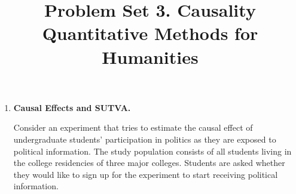 \documentclass[12pt]{article}
\author{\empty}
\title{Problem Set 3. Causality \\ Quantitative Methods for Humanities}
\date{\empty}
\begin{document}
\maketitle

\bigskip

\begin{enumerate}
    \item \textbf{Causal Effects and SUTVA.}
    
    Consider an experiment that tries to estimate the causal effect of undergraduate students' participation in politics as they are exposed to political information. The study population consists of all students living in the college residencies of three major colleges. Students are asked whether they would like to sign up for the experiment to start receiving political information.
    

\end{enumerate}
\end{document}
